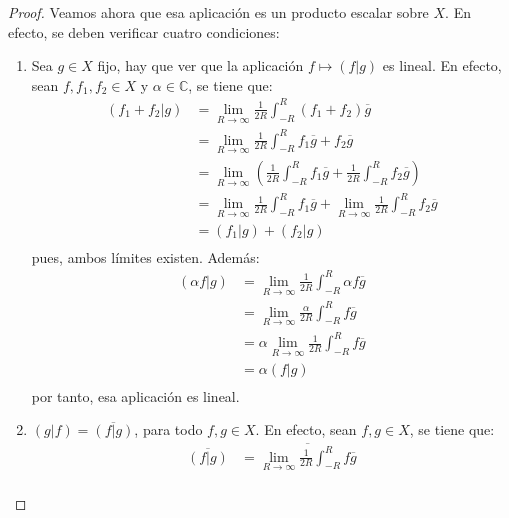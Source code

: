 \documentclass[12pt]{report}
\theoremstyle{largebreak}
\newcommand\pint[2]{\ensuremath{\left(#1\big|#2\right)}}
\newcommand\conj[1]{\ensuremath{\overline{#1}}}
\begin{document}
\begin{proof}
        Veamos ahora que esa aplicación es un producto escalar sobre $X$. En efecto, se deben verificar cuatro condiciones:
        \begin{enumerate}
            \item Sea $g\in X$ fijo, hay que ver que la aplicación $f\mapsto \pint{f}{g}$ es lineal. En efecto, sean $f,f_1,f_2\in X$ y $\alpha\in \mathbb{C}$, se tiene que:
            \begin{equation*}
                \begin{split}
                    \pint{f_1+f_2}{g}&=\lim_{R\rightarrow\infty }\frac{1}{2R}\int_{-R}^{R}(f_1+f_2)\conj{g}\\
                    &=\lim_{R\rightarrow\infty }\frac{1}{2R}\int_{-R}^{R}f_1\conj{g}+f_2\conj{g}\\
                    &=\lim_{R\rightarrow\infty }\left(\frac{1}{2R}\int_{-R}^{R}f_1\conj{g}+\frac{1}{2R}\int_{-R}^{R}f_2\conj{g}\right)\\
                    &=\lim_{R\rightarrow\infty}\frac{1}{2R}\int_{-R}^{R}f_1\conj{g}+\lim_{R\rightarrow\infty}\frac{1}{2R}\int_{-R}^{R}f_2\conj{g}\\
                    &=\pint{f_1}{g}+\pint{f_2}{g}\\
                \end{split}
            \end{equation*}
            pues, ambos límites existen. Además:
            \begin{equation*}
                \begin{split}
                    \pint{\alpha f}{g}&=\lim_{R\rightarrow\infty }\frac{1}{2R}\int_{-R}^{R}\alpha f\conj{g}\\
                    &=\lim_{R\rightarrow\infty }\frac{\alpha}{2R}\int_{-R}^{R} f\conj{g}\\
                    &=\alpha\lim_{R\rightarrow\infty }\frac{1}{2R}\int_{-R}^{R} f\conj{g}\\
                    &=\alpha\pint{f}{g}\\
                \end{split}
            \end{equation*}
            por tanto, esa aplicación es lineal.
            \item $\pint{g}{f}=\conj{\pint{f}{g}}$, para todo $f,g\in X$. En efecto, sean $f,g\in X$, se tiene que:
            \begin{equation*}
                \begin{split}
                    \conj{\pint{f}{g}}&=\conj{\lim_{R\rightarrow\infty }\frac{1}{2R}\int_{-R}^{R}f\conj{g}} \\

\end{split}
\end{equation*}
\end{enumerate}
\end{proof}
\end{document}
